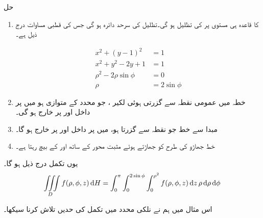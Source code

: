 حل
\begin {enumerate}[1.]
\item
{}\quad
{}  کا  قاعدہ ہی  مستوی  پر  کی تظلیل   ہو  گی۔تظلیل  کی سرحد دائرہ  ہو گی جس کی قطبی مساوات درج ذیل ہے۔


\begin {align*}
x^2+(y-1)^2&=1\\
x^2+y^2-2y+1&=1\\
\rho^2-2\rho\sin\phi&=0\\
\rho&=2\sin\phi
\end {align*}
\item
{}\quad
خطہ  میں عمومی نقطہ  سے گزرتی ہوئی لکیر ، جو  محدد کے متوازی  ہو  میں    پر داخل اور  پر خارج  ہو گی۔
\item
{}\quad
مبدا سے  خط  جو نقطہ   سے گزرتا ہو،  میں  پر داخل اور  پر خارج ہو گا۔
\item
{}\quad
خط   جھاڑو کی طرح  کو جھاڑتے ہوئے مثبت  محور کے ساتھ  اور کے بیچ رہتا ہے۔
\end {enumerate}
یوں تکمل درج ذیل ہو گا۔
\begin{align*}
\iiint\limits_D f(\rho,\phi,z)\dif H=\int_{0}^{\pi}\int_0^{2\sin\phi}\int_{0}^{\rho^2}f(\rho,\phi,z)\dif z \,\rho\dif \rho\dif \phi
\end{align*}


اس مثال میں ہم نے نلکی محدد میں تکمل کی حدیں تلاش کرنا سیکھا۔



